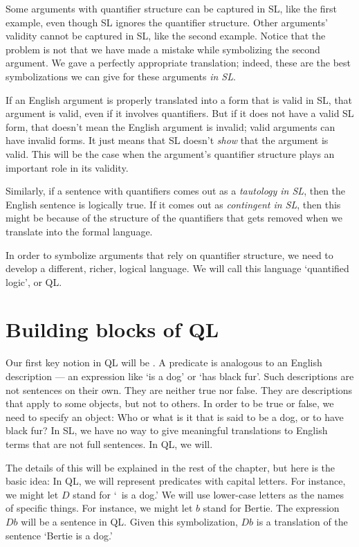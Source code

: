 Some arguments with quantifier structure can be captured in SL, like the first example, even though SL ignores the quantifier structure. Other arguments' validity cannot be captured in SL, like the second example. Notice that the problem is not that we have made a mistake while symbolizing the second argument. We gave a perfectly appropriate translation; indeed, these are the best symbolizations we can give for these arguments \emph{in SL}.

If an English argument is properly translated into a form that is valid in SL, that argument is valid, even if it involves quantifiers. But if it does not have a valid SL form, that doesn't mean the English argument is invalid; valid arguments can have invalid forms. It just means that SL doesn't \emph{show} that the argument is valid. This will be the case when the argument's quantifier structure plays an important role in its validity.

Similarly, if a sentence with quantifiers comes out as a \emph{tautology in SL}, then the English sentence is logically true. If it comes out as \emph{contingent in SL}, then this might be because of the structure of the quantifiers that gets removed when we translate into the formal language.

In order to symbolize arguments that rely on quantifier structure, we need to develop a different, richer, logical language. We will call this language `quantified logic', or QL.

\section{Building blocks of QL}

Our first key notion in QL will be . A predicate is analogous to an English description  --- an expression like `is a dog' or `has black fur'. Such descriptions are not sentences on their own. They are neither true nor false. They are descriptions that apply to some objects, but not to others. In order to be true or false, we need to specify an object: Who or what is it that is said to be a dog, or to have black fur? In SL, we have no way to give meaningful translations to English terms that are not full sentences. In QL, we will.

The details of this will be explained in the rest of the chapter, but here is the basic idea: In QL, we will represent predicates with capital letters. For instance, we might let $D$ stand for `\blank\ is a dog.' We will use lower-case letters as the names of specific things. For instance, we might let $b$ stand for Bertie. The expression $Db$ will be a sentence in QL. Given this symbolization, $Db$ is a translation of the sentence `Bertie is a dog.'

